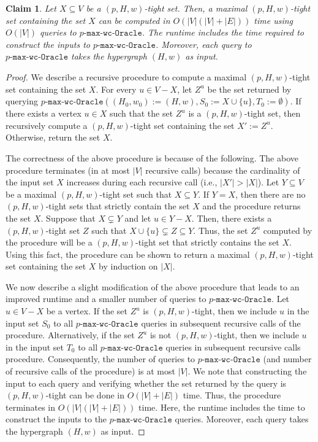 \documentclass{article}
\newtheorem{claim}{Claim}[section]
\newcommand{\functionMaximizationOracle}[1]{\ensuremath{{#1}\text{-}\mathtt{max}\text{-}\mathtt{wc}\text{-}\mathtt{Oracle}}\xspace}
\begin{document}
\begin{claim}\label{claim:FunctionMaximizetionOracles:maximal-tight-set-containing-given-tight-set}
         Let $X \subseteq V$ be a $(p, H, w)$-tight set. Then, a maximal $(p, H, w)$-tight set containing the set $X$ can be computed in $O(|V|(|V|+|E|))$ time using $O(|V|)$ queries to \functionMaximizationOracle{p}. The runtime includes the time required to construct the inputs to \functionMaximizationOracle{p}. Moreover, each query to \functionMaximizationOracle{p} takes the hypergraph $(H, w)$ as input.
\end{claim}
\begin{proof}
We describe a recursive procedure to compute a maximal $(p, H, w)$-tight set containing the set $X$. For every $u \in V - X$, let $Z^u$ be the set returned by querying $\functionMaximizationOracle{p}((H_0, w_0):= (H, w), S_0 := X\cup\{u\}, T_0 := \emptyset)$. If there exists a vertex $u \in X$ such that the set $Z^u$ is a $(p, H, w)$-tight set, then recursively compute a $(p, H, w)$-tight set containing the set $X':= Z^u$. Otherwise, return the set $X$. 

The correctness of the above procedure is because of the following. The above procedure terminates (in at most $|V|$ recursive calls) because the cardinality of the input set $X$ increases during each recursive call (i.e., $|X'| > |X|$). Let $Y \subseteq V$ be a maximal $(p, H, w)$-tight set such that $X \subseteq Y$. If $Y = X$, then there are no $(p, H, w)$-tight sets that strictly contain the set $X$ and the procedure returns the set $X$. Suppose that $X \subsetneq Y$ and let $u \in Y - X$. Then, there exists a $(p, H, w)$-tight set $Z$ such that $X\cup\{u\} \subsetneq Z \subseteq Y$. Thus, the set $Z^u$ computed by the procedure will be a $(p, H, w)$-tight set that strictly contains the set $X$. Using this fact, the procedure can be shown to return a maximal $(p, H, w)$-tight set containing the set $X$ by induction on $|X|$.   
    
We now describe a slight modification of the above procedure that leads to an improved runtime and a smaller number of queries to \functionMaximizationOracle{p}. Let $u \in V - X$ be a vertex. If the set $Z^{u}$ is $(p, H, w)$-tight, then we include $u$ in the input set $S_0$ to all $\functionMaximizationOracle{p}$ queries in subsequent recursive calls of the procedure. Alternatively, if the set $Z^{u}$ is not $(p, H, w)$-tight, then we include $u$ in the input set $T_0$ to all $\functionMaximizationOracle{p}$ queries in subsequent recursive calls procedure. Consequently, the number of queries to $\functionMaximizationOracle{p}$ (and number of recursive calls of the procedure) is at most $|V|$. We note that constructing the input to each query and verifying whether the set returned by the query is $(p, H, w)$-tight can be done in $O(|V| + |E|)$ time. Thus, the procedure terminates in $O(|V|(|V|+|E|))$ time. Here, the runtime includes the time to construct the inputs to the \functionMaximizationOracle{p} queries. Moreover, each query takes the hypergraph $(H,w)$ as input. 
\end{proof}
    
\end{document}
